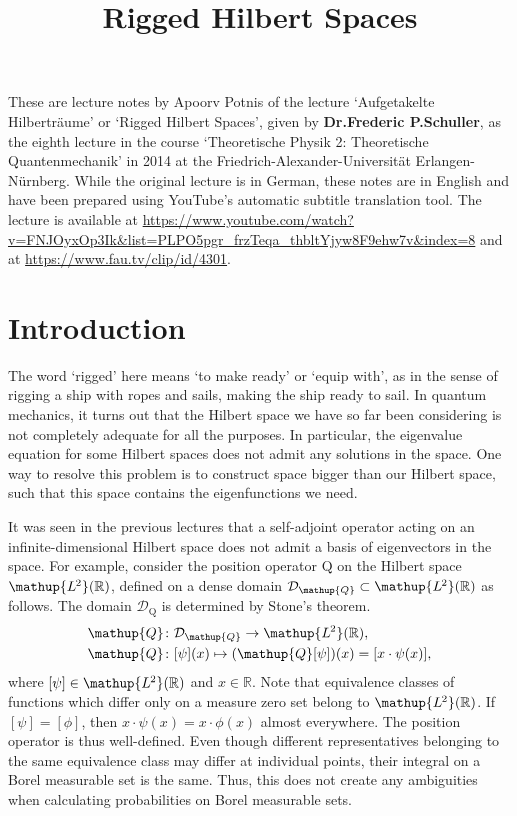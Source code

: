 \documentclass[a4 paper]{article}
\title{Rigged Hilbert Spaces}
\author{}
\date{\vspace{-5ex}}
\theoremstyle{definition}
\newcommand{\ltwo}{\mathup{L\kern-0.5pt^2}}
\newcommand{\position}{\mathup{Q}}
\newcommand{\rr}{\mathbb{R}}
\newcommand{\ltwor}{\ltwo(\rr)}
\newcommand{\domain}{\mathcal{D}}
\begin{document}
	\maketitle

	These are lecture notes by Apoorv Potnis of the lecture `Aufgetakelte Hilberträume' or `Rigged Hilbert Spaces', given by \textbf{Dr.\@ Frederic P.\@ Schuller}, as the eighth lecture in the course `Theoretische Physik 2: Theoretische Quantenmechanik' in 2014 at the Friedrich-Alexander-Universität Erlangen-Nürnberg. While the original lecture is in German, these notes are in English and have been prepared using YouTube's automatic subtitle translation tool. The lecture is available at \url{https://www.youtube.com/watch?v=FNJOyxOp3Ik&list=PLPO5pgr_frzTeqa_thbltYjyw8F9ehw7v&index=8} and at \url{https://www.fau.tv/clip/id/4301}.

	\tableofcontents{}

	\section{Introduction}

	The word `rigged' here means `to make ready' or `equip with', as in the sense of rigging a ship with ropes and sails, making the ship ready to sail. In quantum mechanics, it turns out that the Hilbert space we have so far been considering is not completely adequate for all the purposes. In particular, the eigenvalue equation for some Hilbert spaces does not admit any solutions in the space. One way to resolve this problem is to construct space bigger than our Hilbert space, such that this space contains the eigenfunctions we need.

	It was seen in the previous lectures that a self-adjoint operator acting on an infinite-dimensional Hilbert space does not admit a basis of eigenvectors in the space. For example, consider the position operator $\position$ on the Hilbert space \(\ltwor\), defined on a dense domain \(\domain_{\position} \subset \ltwor\) as follows. The domain $\domain_{\position}$ is determined by Stone's  theorem.
	\begin{align*}
		\position &\colon \domain_\position \rightarrow \ltwor,\\
		\position &\colon [\psi](x) \mapsto (\position[\psi])(x) = [x \cdot \psi(x)],
	\end{align*}
	where \([\psi] \in \ltwor\) and \(x \in \rr\). Note that equivalence classes of functions which differ only on a measure zero set belong to \(\ltwor\). If $[\psi] = [\phi]$, then $x \cdot \psi(x) = x \cdot \phi(x)$ almost everywhere. The position operator is thus well-defined. Even though different representatives belonging to the same equivalence class may differ at individual points, their integral on a Borel measurable set is the same. Thus, this does not create any ambiguities when calculating probabilities on Borel measurable sets.
\end{document}
